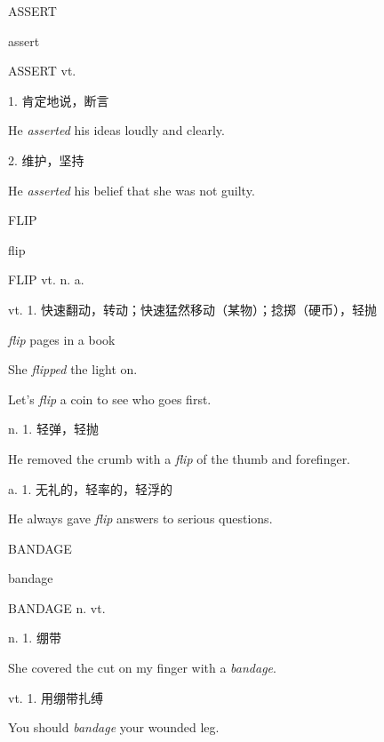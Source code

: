 \begin{flashcard}{
ASSERT

assert
}
\begin{center}
ASSERT vt. 
\end{center}
1. 肯定地说，断言

He \textit{asserted} his ideas loudly and clearly.

2. 维护，坚持

He \textit{asserted} his belief that she was not guilty.

\end{flashcard}
\begin{flashcard}{
FLIP

flip
}
\begin{center}
FLIP vt. n. a. \textipa{[flip]}
\end{center}
\normalsize vt. 1. 快速翻动，转动；快速猛然移动（某物）；捻掷（硬币），轻抛

\footnotesize \textit{flip} pages in a book

\footnotesize She \textit{flipped} the light on.

\footnotesize Let's \textit{flip} a coin to see who goes first.

\normalsize n. 1. 轻弹，轻抛

\footnotesize He removed the crumb with a \textit{flip} of the thumb and forefinger.

\normalsize a. 1. 无礼的，轻率的，轻浮的

\footnotesize He always gave \textit{flip} answers to serious questions.

\end{flashcard}
\begin{flashcard}{
BANDAGE

bandage
}
\begin{center}
BANDAGE n. vt. 
\end{center}
n. 1. 绷带

She covered the cut on my finger with a \textit{bandage}.

vt. 1. 用绷带扎缚

You should \textit{bandage} your wounded leg.

\end{flashcard}
